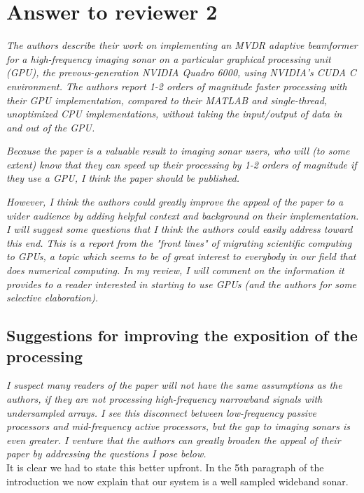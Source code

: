 \documentclass[11pt]{article} %
\newcommand\1{\vec 1}
\newcommand\q[1]{\textit{#1}}
\newcommand\ans[1]{#1}
\begin{document}
\newpage
\section{Answer to reviewer 2}

\q{The authors describe their work on implementing an MVDR adaptive beamformer for a high-frequency imaging sonar on a particular graphical processing unit (GPU), the prevous-generation NVIDIA Quadro 6000, using NVIDIA's CUDA C environment. The authors report 1-2 orders of magnitude faster processing with their GPU implementation, compared to their MATLAB and single-thread, unoptimized CPU implementations, without taking the input/output of data in and out of the GPU.}

\q{Because the paper is a valuable result to imaging sonar users, who will (to some extent) know that they can speed up their processing by 1-2 orders of magnitude if they use a GPU, I think the paper should be published.}

\q{However, I think the authors could greatly improve the appeal of the paper to a wider audience by adding helpful context and background on their implementation. I will suggest some questions that I think the authors could easily address toward this end. This is a report from the "front lines" of migrating scientific computing to GPUs, a topic which seems to be of great interest to everybody in our field that does numerical computing. In my review, I will comment on the information it provides to a reader interested in starting to use GPUs (and the authors for some selective elaboration).}

\subsection*{Suggestions for improving the exposition of the processing}

\q{I suspect many readers of the paper will not have the same assumptions as the authors, if they are not processing high-frequency narrowband signals with undersampled arrays. I see this disconnect between low-frequency passive processors and mid-frequency active processors, but the gap to imaging sonars is even greater. I venture that the authors can greatly broaden the appeal of their paper by addressing the questions I pose below.}\\[-.5\baselineskip]

\ans{It is clear we had to state this better upfront. In the 5th paragraph of the introduction we now explain that our system is a well sampled wideband sonar.}
\end{document}
